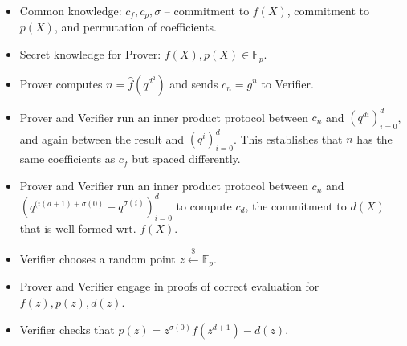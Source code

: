 \documentclass{article}
\theoremstyle{definition}
\begin{document}
\begin{itemize}
    \item Common knowledge: $c_f, c_p, \sigma$ -- commitment to $f(X)$, commitment to $p(X)$, and permutation of coefficients.
    \item Secret knowledge for Prover: $f(X), p(X) \in \mathbb{F}_p$.
    \item Prover computes $n = \hat{f}(q^{d^2})$ and sends $c_n = g^n$ to Verifier.
    \item Prover and Verifier run an inner product protocol between $c_n$ and $(q^{di})_{i=0}^d$, and again between the result and $(q^i)_{i=0}^d$. This establishes that $n$ has the same coefficients as $c_f$ but spaced differently.
    \item Prover and Verifier run an inner product protocol between $c_n$ and $(q^{(i(d+1) + \sigma(0)} - q^{\sigma(i)})_{i=0}^d$ to compute $c_d$, the commitment to $d(X)$ that is well-formed wrt. $f(X)$.
    \item Verifier chooses a random point $z \xleftarrow{\$} \mathbb{F}_p$.
    \item Prover and Verifier engage in proofs of correct evaluation for $f(z), p(z), d(z)$.
    \item Verifier checks that $p(z) = z^{\sigma(0)} f(z^{d+1}) - d(z)$.
\end{itemize}
\end{document}
